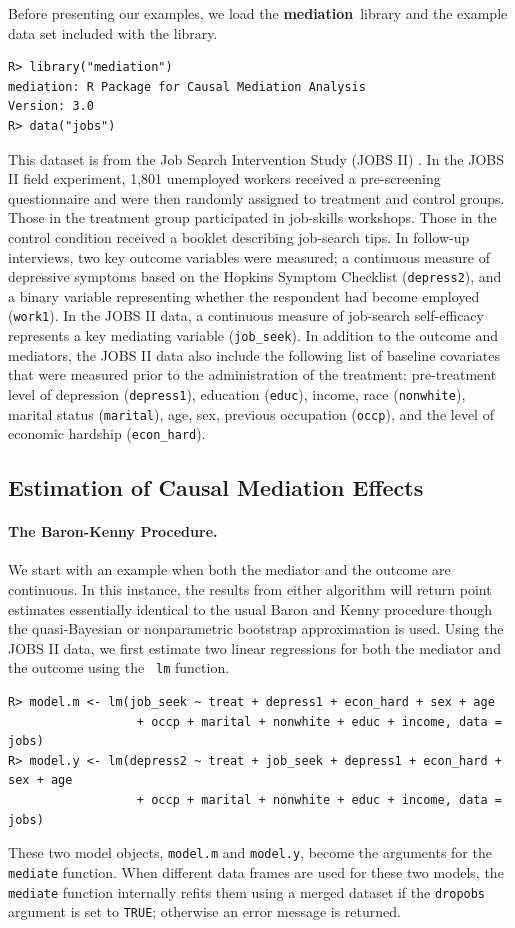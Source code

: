 \documentclass[11pt,letterpaper]{article}
\theoremstyle{plain}
\newcommand\bmediation{{\bf mediation}}
\begin{document}
Before presenting our examples, we load the \bmediation\ library and
the example data set included with the library.
\begin{verbatim}
R> library("mediation")
mediation: R Package for Causal Mediation Analysis
Version: 3.0
R> data("jobs")
\end{verbatim}
This dataset is from the Job Search Intervention Study (JOBS II)
\citep{Vinokur:1997}. In the JOBS II field experiment, 1,801
unemployed workers received a pre-screening questionnaire and were
then randomly assigned to treatment and control groups. Those in the
treatment group participated in job-skills workshops.  Those in the
control condition received a booklet describing job-search tips. In
follow-up interviews, two key outcome variables were measured; a
continuous measure of depressive symptoms based on the Hopkins Symptom
Checklist (\texttt{depress2}), and a binary variable representing
whether the respondent had become employed (\texttt{work1}). In the
JOBS II data, a continuous measure of job-search self-efficacy
represents a key mediating variable (\texttt{job\_seek}). In addition
to the outcome and mediators, the JOBS II data also include the
following list of baseline covariates that were measured prior to the
administration of the treatment: pre-treatment level of depression
(\texttt{depress1}), education (\texttt{educ}), income, race
(\texttt{nonwhite}), marital status (\texttt{marital}), age, sex,
previous occupation (\texttt{occp}), and the level of economic
hardship (\texttt{econ\_hard}).

\subsection{Estimation of Causal Mediation Effects}

\paragraph{The Baron-Kenny Procedure.}
We start with an example when both the mediator and the outcome are
continuous.  In this instance, the results from either algorithm will
return point estimates essentially identical to the usual Baron and
Kenny procedure though the quasi-Bayesian or nonparametric bootstrap
approximation is used.  Using the JOBS II data, we first estimate two
linear regressions for both the mediator and the outcome using the {\tt
lm} function.
\begin{verbatim}
R> model.m <- lm(job_seek ~ treat + depress1 + econ_hard + sex + age
                  + occp + marital + nonwhite + educ + income, data = jobs)
R> model.y <- lm(depress2 ~ treat + job_seek + depress1 + econ_hard + sex + age
                  + occp + marital + nonwhite + educ + income, data = jobs)
\end{verbatim}
These two model objects, {\tt model.m} and {\tt model.y}, become the
arguments for the \texttt{mediate} function.  When different data frames
are used for these two models, the {\tt mediate} function internally refits
them using a merged dataset if the {\tt dropobs} argument is set to
{\tt TRUE}; otherwise an error message is returned.
\end{document}
